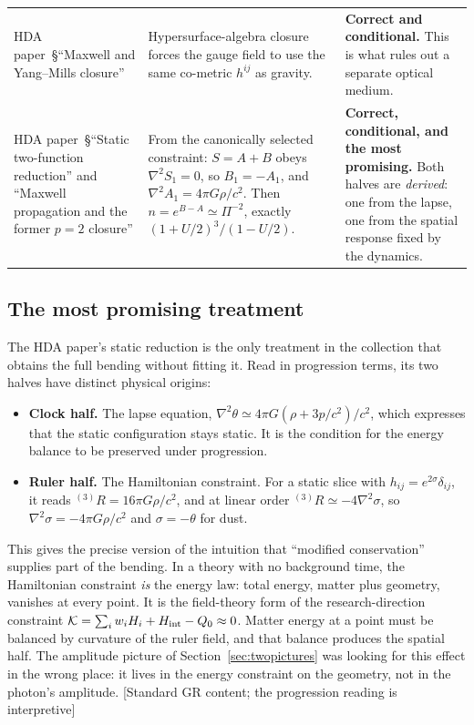 \documentclass[11pt]{article}
\newcommand{\Pg}{\Pi}
\newcommand{\thP}{\theta}
\newcommand{\sgP}{\sigma}
\newcommand{\st}[1]{\textsf{\small[#1]}}
\theoremstyle{plain}
\theoremstyle{remark}
\begin{document}
\begin{longtable}{@{}p{}p{}p{}@{}}
HDA paper~\S``Maxwell and Yang--Mills closure'' & Hypersurface-algebra closure forces the gauge field to use the same co-metric $h^{ij}$ as gravity. & \textbf{Correct and conditional.} This is what rules out a separate optical medium. \\
HDA paper~\S``Static two-function reduction'' and ``Maxwell propagation and the former $p=2$ closure'' & From the canonically selected constraint: $S=A+B$ obeys $\nabla^2S_1=0$, so $B_1=-A_1$, and $\nabla^2A_1=4\pi G\rho/c^2$. Then $n=e^{B-A}\simeq\Pg^{-2}$, exactly $(1+U/2)^3/(1-U/2)$. & \textbf{Correct, conditional, and the most promising.} Both halves are \emph{derived}: one from the lapse, one from the spatial response fixed by the dynamics. \\
\bottomrule
\end{longtable}

\subsection{The most promising treatment}

The HDA paper's static reduction is the only treatment in the collection that obtains the full bending without fitting it. Read in progression terms, its two halves have distinct physical origins:
\begin{itemize}
\item \textbf{Clock half.} The lapse equation, $\nabla^2\thP\simeq4\pi G(\rho+3p/c^2)/c^2$, which expresses that the static configuration stays static. It is the condition for the energy balance to be preserved under progression.
\item \textbf{Ruler half.} The Hamiltonian constraint. For a static slice with $h_{ij}=e^{2\sgP}\delta_{ij}$, it reads ${}^{(3)}\!R=16\pi G\rho/c^2$, and at linear order ${}^{(3)}\!R\simeq-4\nabla^2\sgP$, so $\nabla^2\sgP=-4\pi G\rho/c^2$ and $\sgP=-\thP$ for dust.
\end{itemize}
This gives the precise version of the intuition that ``modified conservation'' supplies part of the bending. In a theory with no background time, the Hamiltonian constraint \emph{is} the energy law: total energy, matter plus geometry, vanishes at every point. It is the field-theory form of the research-direction constraint $\mathcal K=\sum_iw_iH_i+H_{\rm int}-Q_0\approx0$. Matter energy at a point must be balanced by curvature of the ruler field, and that balance produces the spatial half. The amplitude picture of Section~\ref{sec:twopictures} was looking for this effect in the wrong place: it lives in the energy constraint on the geometry, not in the photon's amplitude. \st{Standard GR content; the progression reading is interpretive}
\end{document}
